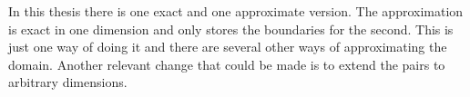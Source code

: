 \documentclass[a4paper,11pt]{article}
\begin{document}
In this thesis there is one exact and one approximate version. The approximation is exact in one dimension and only stores the boundaries for the second. This is just one way of doing it and there are several other ways of approximating the domain. Another relevant change that could be made is to extend the pairs to arbitrary dimensions.
\end{document}
